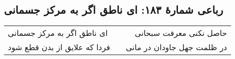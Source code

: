 \begin{center}
\section*{رباعی شمارهٔ ۱۸۳: ای ناطق اگر به مرکز جسمانی}
\label{sec:183}
\begin{longtable}{l p{0.5cm} r}
ای ناطق اگر به مرکز جسمانی
&&
حاصل نکنی معرفت سبحانی
\\
فردا که علایق از بدن قطع شود
&&
در ظلمت جهل جاودان در مانی
\\
\end{longtable}
\end{center}
